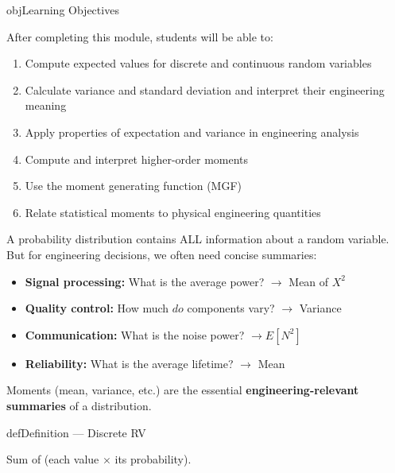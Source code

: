 \begin{PSbox}[unbreakable]{obj}{Learning Objectives}

After completing this module, students will be able to:

\begin{enumerate}
\def\labelenumi{\arabic{enumi}.}
\tightlist
\item
  Compute expected values for discrete and continuous random variables
\item
  Calculate variance and standard deviation and interpret their engineering meaning
\item
  Apply properties of expectation and variance in engineering analysis
\item
  Compute and interpret higher-order moments
\item
  Use the moment generating function (MGF)
\item
  Relate statistical moments to physical engineering quantities
\end{enumerate}

\end{PSbox}



A probability distribution contains ALL information about a random variable. But for engineering decisions, we often need concise summaries:

\begin{itemize}
\tightlist
\item
  \textbf{Signal processing:} What is the average power? \ensuremath{\to} Mean of $X^{2}$
\item
  \textbf{Quality control:} How much $do$ components vary? \ensuremath{\to} Variance
\item
  \textbf{Communication:} What is the noise power? $\to E[N^{2}]$
\item
  \textbf{Reliability:} What is the average lifetime? \ensuremath{\to} Mean
\end{itemize}

Moments (mean, variance, etc.) are the essential \textbf{engineering-relevant summaries} of a distribution.


\begin{PSbox}[unbreakable]{def}{Definition — Discrete RV}


Sum of (each value \ensuremath{\times} its probability).

\end{PSbox}

